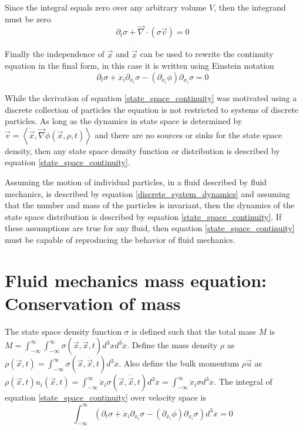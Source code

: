 \documentclass[%
preprint,
 amsmath,amssymb,
 aps,
]{revtex4-1}
\newcommand{\dvec}[1]{\dot{\vec{#1}}}
\newcommand{\grad}{\vec{\nabla}}
\newcommand{\intVdot}[1]{\int_{-\infty}^{\infty} #1 d^3\dot{x}}
\newcommand{\intVVdot}[1]{\int_{-\infty}^{\infty}\int_{-\infty}^{\infty} #1 d^3xd^3\dot{x}}
\begin{document}
Since the integral equals zero over any arbitrary volume $V$, then the integrand must be zero
\[
\partial_t \sigma + \grad\cdot\left(\sigma\vec{v}\right)=0
\]

Finally the independence of $\vec{x}$ and $\dvec{x}$ can be used to rewrite the continuity equation in the final form, in this case it is written using Einstein notation
\begin{equation}
\partial_t \sigma + \dot{x}_i\partial_{x_i}\sigma-\left(\partial_{x_i}\phi\right)\partial_{\dot{x}_i}\sigma=0
\label{state_space_continuity}
\end{equation}

While the derivation of equation \eqref{state_space_continuity} was motivated using a discrete collection of particles the equation is not restricted to systems of discrete particles. As long as the dynamics in state space is determined by $\vec{v}=\left\langle\dvec{x}, \grad\phi(\vec{x}, \rho, t)\right\rangle$ and there are no sources or sinks for the state space density, then any state space density function or distribution is described by equation \eqref{state_space_continuity}.

Assuming the motion of individual particles, in a fluid described by fluid mechanics, is described by equation \eqref{discrete_system_dynamics} and assuming that the number and mass of the particles is invariant, then the dynamics of the state space distribution is described by equation \eqref{state_space_continuity}. If these assumptions are true for any fluid, then equation \eqref{state_space_continuity} must be capable of reproducing the behavior of fluid mechanics.

\section{Fluid mechanics mass equation: Conservation of mass}
The state space density function $\sigma$ is defined such that the total mass $M$ is $M=\intVVdot{\sigma(\vec{x}, \dvec{x}, t)}$. Define the mass density $\rho$ as $\rho(\vec{x}, t)=\intVdot{\sigma(\vec{x}, \dvec{x}, t)}$. Also define the bulk momentum $\rho\vec{u}$ as $\rho(\vec{x}, t) u_i(\vec{x}, t)=\intVdot{\dot{x}_i\sigma(\vec{x}, \dvec{x}, t)}=\intVdot{\dot{x}_i\sigma}$. The integral of equation \eqref{state_space_continuity} over velocity space is
\[
\intVdot{\left(\partial_t \sigma + \dot{x}_i\partial_{x_i}\sigma-\left(\partial_{x_i}\phi\right)\partial_{\dot{x}_i}\sigma\right)}=0
\]
\end{document}
